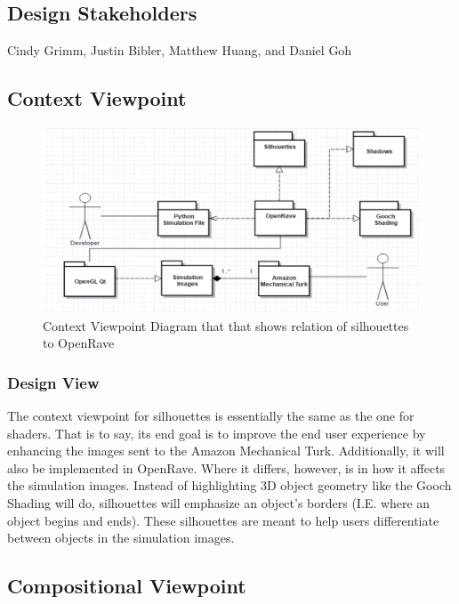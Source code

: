 \documentclass[10pt,journal,compsoc,draftclsnofoot]{IEEEtran}
\begin{document}
\begin{flushleft}
\subsection{Design Stakeholders}
Cindy Grimm, Justin Bibler, Matthew Huang, and Daniel Goh

\subsection{Context Viewpoint}

\begin{figure} [H]
  \includegraphics[scale=0.8]{Silhouettes_context.eps}
  \caption
{ \newline \hspace{\linewidth}
Context Viewpoint Diagram that that shows relation of silhouettes to OpenRave}
  \label{fig:Silhouettes_context}
\end{figure}

\subsubsection{Design View}
The context viewpoint for silhouettes is essentially the same as the one for shaders.
That is to say, its end goal is to improve the end user experience by enhancing the images sent to the Amazon Mechanical Turk.
Additionally, it will also be implemented in OpenRave.
Where it differs, however, is in how it affects the simulation images.
Instead of highlighting 3D object geometry like the Gooch Shading will do, silhouettes will emphasize an object's borders (I.E. where an object begins and ends).
These silhouettes are meant to help users differentiate between objects in the simulation images.

\subsection{Compositional Viewpoint}


\end{flushleft}
\end{document}
